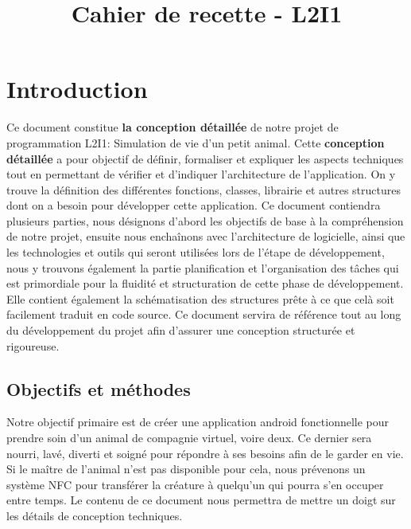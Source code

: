 \documentclass{conception_detaillee}
\title{Cahier de recette - L2I1} %
\begin{document}




        
\fairemarges %
\fairepagedegarde %
\renewcommand{\contentsname}{Sommaire}
\tableofcontents %
\newpage




\section{Introduction} 

Ce document constitue \textbf{la conception détaillée} de notre projet de programmation L2I1: Simulation de vie d’un petit animal. 
Cette \textbf{conception détaillée} a pour objectif de définir, formaliser et expliquer les aspects techniques tout en permettant de vérifier et d’indiquer l’architecture de l’application. On y trouve la définition des différentes fonctions, classes, librairie et autres structures dont on a besoin pour développer cette application.
Ce document contiendra plusieurs parties, nous désignons d’abord les objectifs de base à la compréhension de notre projet, ensuite nous enchaînons avec l’architecture de logicielle, ainsi que les technologies et outils qui seront utilisées lors de l’étape de  développement, nous y trouvons également la partie planification et l’organisation des tâches qui est primordiale pour la fluidité et structuration de cette phase de développement. Elle contient également la schématisation des structures prête à ce que celà soit facilement traduit en code source. 
Ce document servira de référence tout au long du développement du projet afin d’assurer une conception structurée et rigoureuse.

\subsection{Objectifs et méthodes}
Notre objectif primaire est de créer une application android fonctionnelle pour prendre soin d’un animal de compagnie virtuel, voire deux. Ce dernier sera nourri, lavé, diverti et soigné pour répondre à ses besoins afin de le garder en vie. Si le maître de l’animal n’est pas disponible pour cela, nous prévenons un système NFC pour transférer la créature à quelqu'un qui pourra s’en occuper entre temps. Le contenu de ce document nous permettra de mettre un doigt sur les détails de conception techniques.
\end{document}
